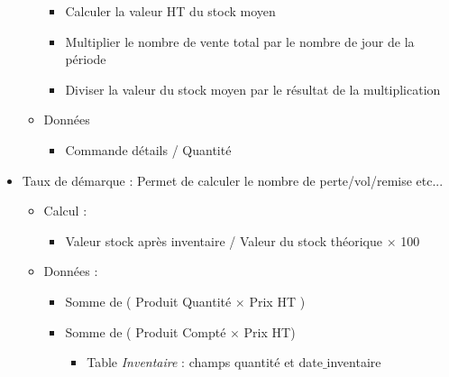 \begin{itemize}
\begin{itemize}
\begin{itemize}
					\item Calculer la valeur HT du stock moyen 

					\item Multiplier le nombre de vente total par le nombre de jour de la période 

					\item Diviser la valeur du stock moyen par le résultat de la multiplication 				
				
				\end{itemize}
				
			\item Données  
			
				\begin{itemize}
				
					\item Commande détails / Quantité  				
				
				\end{itemize}											
		
		\end{itemize}			
		
	\item Taux de démarque : Permet de calculer le nombre de perte/vol/remise etc...
	
		\begin{itemize}
	
			\item Calcul : 
			
				\begin{itemize}
				
					\item Valeur stock après inventaire / Valeur du stock théorique $\times$ 100 				
				
				\end{itemize}				 	
				
			\item Données :   
			
				\begin{itemize}
				
					\item Somme de ( Produit Quantité $\times$ Prix HT )  

					\item Somme de ( Produit Compté $\times$ Prix HT)
					
						\begin{itemize}
						
							\item Table \textit{Inventaire} : champs quantité et date$\_$inventaire						 						
						

\end{itemize}
\end{itemize}
\end{itemize}
\end{itemize}
